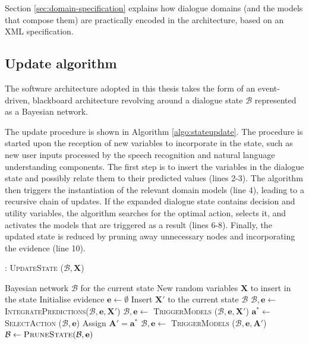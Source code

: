Section \ref{sec:domain-specification} explains how dialogue domains (and the models that compose them) are practically encoded in the \opendial architecture, based on an XML specification. 

\subsection{Update algorithm} 

The software architecture adopted in this thesis takes the form of an event-driven, blackboard architecture revolving around a dialogue state $\mathcal{B}$ represented as a Bayesian network.  %

The update procedure is shown in Algorithm \ref{algo:stateupdate}. The procedure is started upon the reception of new variables to incorporate in the state, such as new user inputs processed by the speech recognition and natural language understanding components. The first step is to insert the variables in the dialogue state and possibly relate them to their predicted values (lines 2-3). The algorithm then triggers the instantiation of the relevant domain models (line 4), leading to a recursive chain of updates.  If the expanded dialogue state contains decision and utility variables, the algorithm searches for the optimal action, selects it, and activates the models that are triggered as a result  (lines 6-8). Finally, the updated state is reduced by pruning away unnecessary nodes and incorporating the evidence (line 10). 


\begin{algorithm}[h]
\caption{: \textsc{UpdateState} ($\mathcal{B}, \mathbf{X}$)}
\begin{algorithmic}[1] \vspace{1mm}
\REQUIRE Bayesian network $\mathcal{B}$ for the current state
\REQUIRE New random variables $\mathbf{X}$ to insert in the state \vspace{1mm}
\STATE Initialise evidence $\mathbf{e} \leftarrow \emptyset$
\STATE Insert $\mathbf{X}'$ to the current state $\mathcal{B}$ 
\STATE $\mathcal{B}, \mathbf{e} \leftarrow $ \textsc{IntegratePredictions}($\mathcal{B}, \mathbf{e}, \mathbf{X}'$)
\STATE $\mathcal{B}, \mathbf{e} \leftarrow$ \textsc{TriggerModels} ($\mathcal{B}, \mathbf{e},  \mathbf{X}'$) \vspace{1mm}
\STATE $\mathbf{a}^* \leftarrow $ \textsc{SelectAction} ($\mathcal{B}, \mathbf{e}$)
\STATE Assign $\mathbf{A}' = \mathbf{a}^*$
\STATE $\mathcal{B}, \mathbf{e} \leftarrow$ \textsc{TriggerModels} ($\mathcal{B}, \mathbf{e}, \mathbf{A}'$)
\ENDWHILE \vspace{1mm}
\STATE $\mathcal{B} \leftarrow \textsc{PruneState} (\mathcal{B}, \mathbf{e})$ \vspace{1mm}
\end{algorithmic}
\label{algo:stateupdate}
\end{algorithm}

